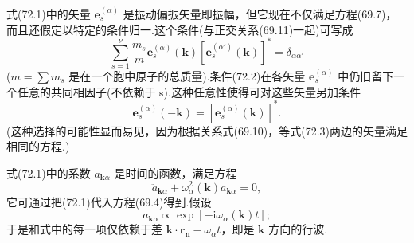 式(72.1)中的矢量 $\boldsymbol{e}_s^{(\alpha)}$ 是振动偏振矢量即振幅，但它现在不仅满足方程(69.7)，而且还假定以特定的条件归一.这个条件(与正交关系(69.11)一起)可写成
\begin{equation}
  \sum_{s=1}^{\nu}\frac{m_s}{m}\boldsymbol{e}_s^{(\alpha)}(\boldsymbol{k})\left[\boldsymbol{e}_s^{(\alpha')}(\boldsymbol{k})\right]^{*}=\delta_{\alpha\alpha'}
\end{equation}
($m=\sum m_s$ 是在一个胞中原子的总质量).条件(72.2)在各矢量 $\boldsymbol{e}_s^{(\alpha)}$ 中仍旧留下一个任意的共同相因子(不依赖于 s).这种任意性使得可对这些矢量另加条件
\begin{equation}
  \boldsymbol{e}_s^{(\alpha)}(-\boldsymbol{k})=\left[\boldsymbol{e}_s^{(\alpha)}(\boldsymbol{k})\right]^{*}.
\end{equation}
(这种选择的可能性显而易见，因为根据关系式(69.10)，等式(72.3)两边的矢量满足相同的方程.)

式(72.1)中的系数 $a_{\boldsymbol{k}\alpha}$ 是时间的函数，满足方程
\begin{equation}
  \ddot{a}_{\boldsymbol{k}\alpha}+\omega_\alpha^2(\boldsymbol{k})a_{\boldsymbol{k}\alpha}=0,
\end{equation}
它可通过把(72.1)代入方程(69.4)得到.假设
\begin{equation}
  a_{\boldsymbol{k}\alpha}\propto\exp\left[-\mathrm{i}\omega_\alpha(\boldsymbol{k})t\right];
\end{equation}
于是和式中的每一项仅依赖于差 $\boldsymbol{k}\cdot\boldsymbol{r}_{\boldsymbol{n}}-\omega_\alpha t$，即是 $\boldsymbol{k}$ 方向的行波.

